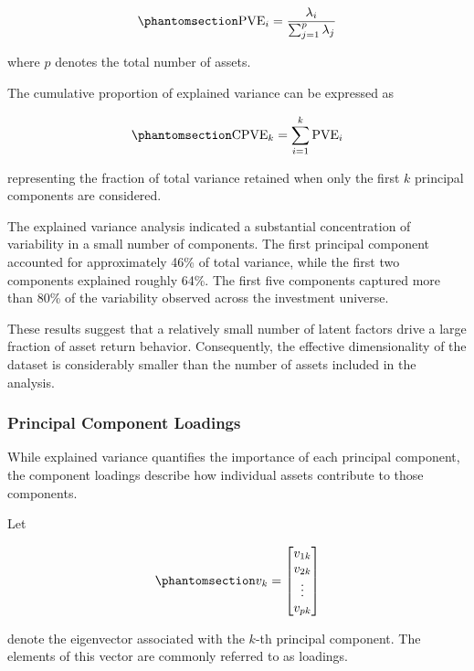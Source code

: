 \documentclass[
  12pt,
  letterpaper,
]{book}
\begin{document}
\begin{equation}\phantomsection\label{eq-pve}{
\text{PVE}_i = \frac{\lambda_i}{\sum_{j=1}^{p}\lambda_j}
}\end{equation}

where \(p\) denotes the total number of assets.

The cumulative proportion of explained variance can be expressed as

\begin{equation}\phantomsection\label{eq-cpve}{
\text{CPVE}_k = \sum_{i=1}^{k} \text{PVE}_i
}\end{equation}

representing the fraction of total variance retained when only the first
\(k\) principal components are considered.

The explained variance analysis indicated a substantial concentration of
variability in a small number of components. The first principal
component accounted for approximately 46\% of total variance, while the
first two components explained roughly 64\%. The first five components
captured more than 80\% of the variability observed across the
investment universe.

These results suggest that a relatively small number of latent factors
drive a large fraction of asset return behavior. Consequently, the
effective dimensionality of the dataset is considerably smaller than the
number of assets included in the analysis.

\subsubsection{Principal Component
Loadings}\label{principal-component-loadings}

While explained variance quantifies the importance of each principal
component, the component loadings describe how individual assets
contribute to those components.

Let

\begin{equation}\phantomsection\label{eq-loading-vector}{
v_k =
\begin{bmatrix}
v_{1k} \\
v_{2k} \\
\vdots \\
v_{pk}
\end{bmatrix}
}\end{equation}

denote the eigenvector associated with the \(k\)-th principal component.
The elements of this vector are commonly referred to as loadings.
\end{document}
